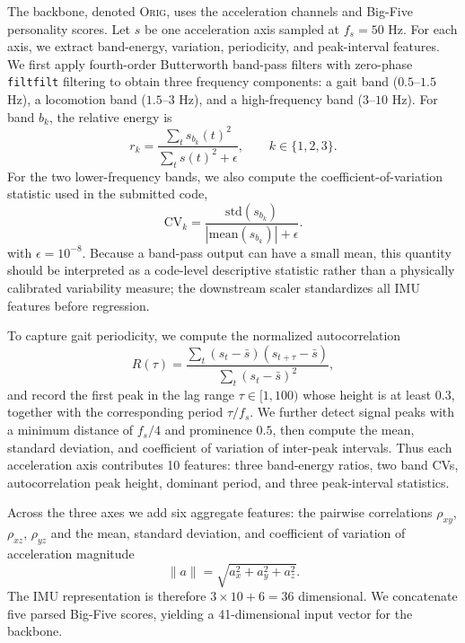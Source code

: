 \documentclass[sigconf,screen,review]{acmart}
\begin{document}
The backbone, denoted \textsc{Orig}, uses the acceleration channels and Big-Five
personality scores. Let $s$ be one acceleration axis sampled at $f_s=50$ Hz. For
each axis, we extract band-energy, variation, periodicity, and peak-interval
features. We first apply fourth-order Butterworth band-pass filters with
zero-phase \texttt{filtfilt} filtering to obtain
three frequency components: a gait band ($0.5$--$1.5$ Hz), a locomotion band
($1.5$--$3$ Hz), and a high-frequency band ($3$--$10$ Hz). For band $b_k$, the
relative energy is
\begin{equation}
r_k =
\frac{\sum_t s_{b_k}(t)^2}
{\sum_t s(t)^2+\epsilon},
\qquad k\in\{1,2,3\}.
\label{eq:imu-energy}
\end{equation}
For the two lower-frequency bands, we also compute the coefficient-of-variation
statistic used in the submitted code,
\begin{equation}
\mathrm{CV}_k =
\frac{\mathrm{std}(s_{b_k})}
{|\mathrm{mean}(s_{b_k})|+\epsilon}.
\label{eq:imu-cv}
\end{equation}
with $\epsilon=10^{-8}$. Because a band-pass output can have a small mean, this
quantity should be interpreted as a code-level descriptive statistic rather than
a physically calibrated variability measure; the downstream scaler standardizes
all IMU features before regression.

To capture gait periodicity, we compute the normalized autocorrelation
\begin{equation}
R(\tau)=
\frac{\sum_t (s_t-\bar{s})(s_{t+\tau}-\bar{s})}
{\sum_t (s_t-\bar{s})^2},
\label{eq:imu-autocorr}
\end{equation}
and record the first peak in the lag range $\tau\in[1,100)$ whose height is at
least $0.3$, together with the corresponding period $\tau/f_s$. We further
detect signal peaks with a minimum distance of $f_s/4$ and prominence $0.5$,
then compute the mean, standard deviation, and coefficient of variation of
inter-peak intervals. Thus each acceleration axis contributes 10 features:
three band-energy ratios, two band CVs, autocorrelation peak height, dominant
period, and three peak-interval statistics.

Across the three axes we add six aggregate features: the pairwise correlations
$\rho_{xy}$, $\rho_{xz}$, $\rho_{yz}$ and the mean, standard deviation, and
coefficient of variation of acceleration magnitude
\begin{equation}
\|a\|=\sqrt{a_x^2+a_y^2+a_z^2}.
\label{eq:accel-mag}
\end{equation}
The IMU representation is therefore $3\times10+6=36$ dimensional. We concatenate
five parsed Big-Five scores, yielding a 41-dimensional input vector for the
backbone.
\end{document}
